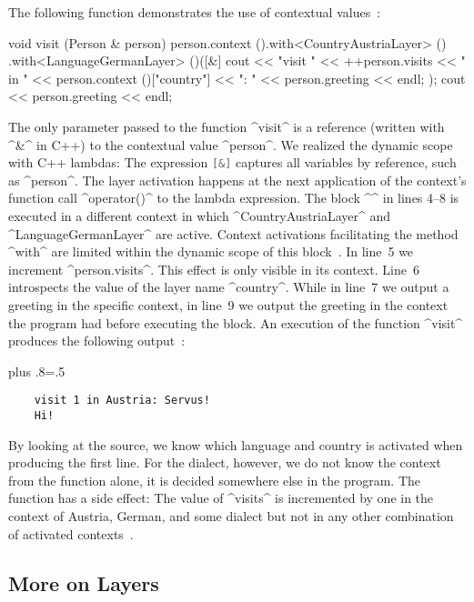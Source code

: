 \begin{example}
The following function demonstrates the use of contextual values~\cite{raab2014program}:

\begin{code}[language=Cpp]
void visit (Person & person)
{
	person.context ().with<CountryAustriaLayer> ()
		             .with<LanguageGermanLayer> ()([&] {
		cout << "visit " << ++person.visits
			 << " in " << person.context ()["country"]
			 << ": " << person.greeting << endl;
	});
	cout << person.greeting << endl;
}
\end{code}

The only parameter passed to the function ^visit^ is a reference (written with ^&^ in C++) to the contextual value ^person^.
We realized the dynamic scope with C++ lambdas:
The expression \lstinline[language=Cpp]^[&]^ captures all variables by reference, such as ^person^.
The layer activation happens at the next application of the context's function call ^operator()^ to the lambda expression.
The block ^{}^ in lines 4--8 is executed in a different context in which ^CountryAustriaLayer^ and ^LanguageGermanLayer^ are active.
Context activations facilitating the method ^with^ are limited within the dynamic scope of this block~\cite{kamina2015generalized}.
In line~5 we increment ^person.visits^.
This effect is only visible in its context.
Line~6 introspects the value of the layer name ^country^.
While in line~7 we output a greeting in the specific context, in line~9 we output the greeting in the context the program had before executing the block.
An execution of the function ^visit^ produces the following output~\cite{raab2014program}:%
{\parfillskip=0pt plus .8\textwidth \emergencystretch=.5\textwidth \par}

\begin{verbatim}
    visit 1 in Austria: Servus!
    Hi!
\end{verbatim}

By looking at the source, we know which language and country is activated when producing the first line.
For the dialect, however, we do not know the context from the function alone, it is decided somewhere else in the program.
The function has a side effect:
The value of ^visits^ is incremented by one in the context of Austria, German, and some dialect but not in any other combination of activated contexts~\cite{raab2014program}.
\end{example}

\subsection{More on Layers}

